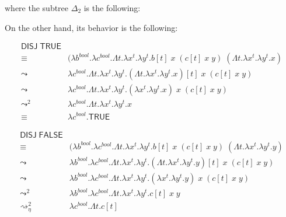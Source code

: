 \documentclass{article}
\begin{document}
where the subtree $\Delta_2$ is the following:

\begin{mathpar}
\end{mathpar}

On the other hand, its behavior is the following:

\begin{align*}
  \mathsf{DISJ}\;\mathsf{TRUE} & \\
    \equiv&
      (\lambda b^\textit{bool}.
      \lambda c^\textit{bool}.
      \Lambda t.
      \lambda x^t.
      \lambda y^t.
      b[t]\;x\;(c[t]\;x\;y)\;
      (\Lambda t. \lambda x^t.\lambda y^t.x) \\
    \leadsto&
      \lambda c^\textit{bool}.
      \Lambda t.
      \lambda x^t.
      \lambda y^t.
      (\Lambda t. \lambda x^t.\lambda y^t.x)[t]\;x\;(c[t]\;x\;y) \\
    \leadsto&
      \lambda c^\textit{bool}.
      \Lambda t.
      \lambda x^t.
      \lambda y^t.
      (\lambda x^t.\lambda y^t.x)\;x\;(c[t]\;x\;y) \\
    \leadsto^{2}&
      \lambda c^\textit{bool}.
      \Lambda t.
      \lambda x^t.
      \lambda y^t.
      x \\
    \equiv&
      \lambda c^\textit{bool}.\mathsf{TRUE}
\end{align*}

\begin{align*}
  \mathsf{DISJ}\;\mathsf{FALSE} & \\
    \equiv&
      (\lambda b^\textit{bool}.
      \lambda c^\textit{bool}.
      \Lambda t.
      \lambda x^t.
      \lambda y^t.
      b[t]\;x\;(c[t]\;x\;y)\;
      (\Lambda t. \lambda x^t.\lambda y^t.y) \\
    \leadsto&
      \lambda b^\textit{bool}.
      \lambda c^\textit{bool}.
      \Lambda t.
      \lambda x^t.
      \lambda y^t.
      (\Lambda t. \lambda x^t.\lambda y^t.y)[t]\;x\;(c[t]\;x\;y) \\
    \leadsto&
      \lambda b^\textit{bool}.
      \lambda c^\textit{bool}.
      \Lambda t.
      \lambda x^t.
      \lambda y^t.
      (\lambda x^t.\lambda y^t.y)\;x\;(c[t]\;x\;y) \\
    \leadsto^{2}&
      \lambda b^\textit{bool}.
      \lambda c^\textit{bool}.
      \Lambda t.
      \lambda x^t.
      \lambda y^t.
      c[t]\;x\;y \\
    \rightsquigarrow_\eta^2&
      \lambda c^\textit{bool}.
      \Lambda t. c[t]
\end{align*}
\end{document}
